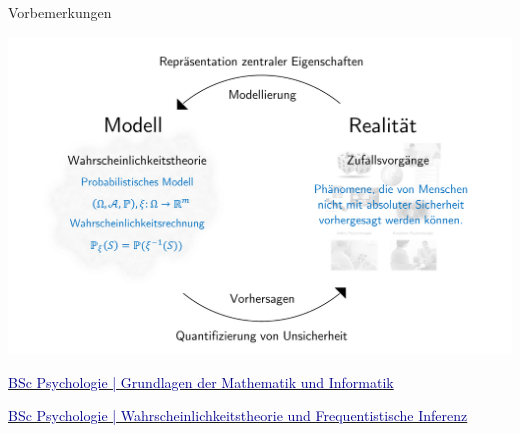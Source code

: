 \documentclass[
  8pt,
  ignorenonframetext,
]{beamer}
\begin{document}
\begin{frame}{Vorbemerkungen}
\protect\hypertarget{vorbemerkungen-1}{}
\vspace{2mm}

\begin{center}\includegraphics[width=0.9\linewidth]{5_Abbildungen/mvda_5_wahrscheinlichkeitstheorie_modell} \end{center}

\small
\center

\href{https://bit.ly/3SNh3nR}{\textcolor{darkblue}{BSc Psychologie | Grundlagen der Mathematik und Informatik}}

\href{https://bit.ly/3yT42Sj}{\textcolor{darkblue}{BSc Psychologie | Wahrscheinlichkeitstheorie und Frequentistische Inferenz}}
\end{frame}
\end{document}

